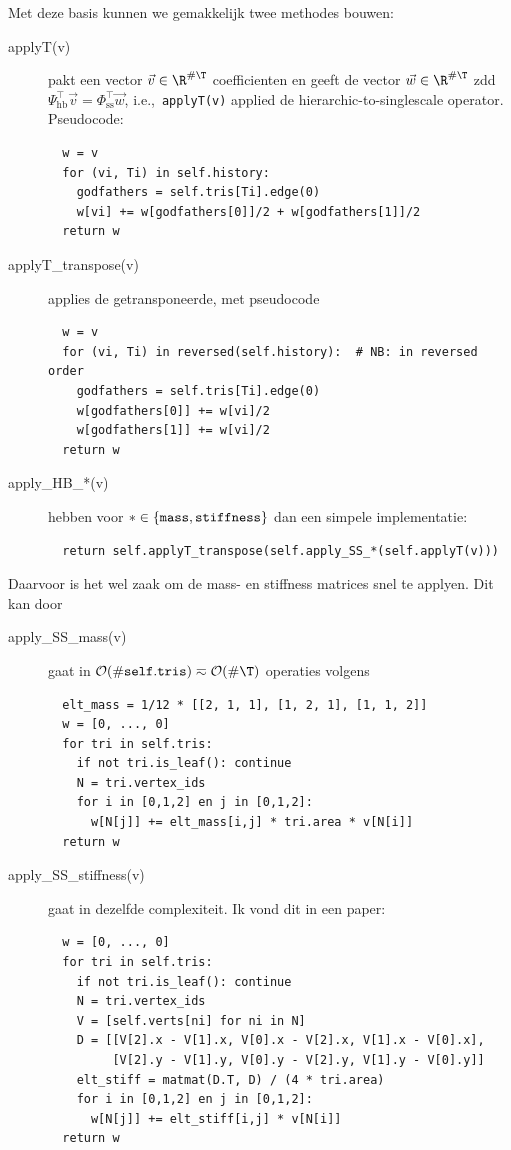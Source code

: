 \documentclass[11pt,a4paper]{amsart}
\theoremstyle{definition}
\begin{document}
Met deze basis kunnen we gemakkelijk twee methodes bouwen:
\begin{description}
  \item[applyT(v)] pakt een vector $\vec v \in \R^{\# \T}$ coefficienten en geeft de vector $\vec w \in \R^{\# \T}$ zdd $\Psi_{\text{hb}}^\top \vec v = \Phi_{\text{ss}}^\top \vec w$,
    i.e.,~\texttt{applyT(v)} applied de hierarchic-to-singlescale operator.
    Pseudocode:
\begin{verbatim}
  w = v
  for (vi, Ti) in self.history:
    godfathers = self.tris[Ti].edge(0)
    w[vi] += w[godfathers[0]]/2 + w[godfathers[1]]/2
  return w
\end{verbatim}
  \item[applyT\_transpose(v)] applies de getransponeerde, met pseudocode
\begin{verbatim}
  w = v
  for (vi, Ti) in reversed(self.history):  # NB: in reversed order
    godfathers = self.tris[Ti].edge(0)
    w[godfathers[0]] += w[vi]/2
    w[godfathers[1]] += w[vi]/2
  return w
\end{verbatim}
  \item[apply\_HB\_*(v)] hebben voor $* \in \set{\mathtt{mass}, \mathtt{stiffness}}$ dan een simpele
    implementatie:
\begin{verbatim}
  return self.applyT_transpose(self.apply_SS_*(self.applyT(v)))
\end{verbatim}
\end{description}
Daarvoor is het wel zaak om de mass- en stiffness matrices snel te applyen. Dit kan door
\begin{description}
  \item[apply\_SS\_mass(v)] gaat in $\mathcal O(\# \mathtt{self.tris}) \eqsim \mathcal O(\# \T)$ operaties volgens
\begin{verbatim}
  elt_mass = 1/12 * [[2, 1, 1], [1, 2, 1], [1, 1, 2]]
  w = [0, ..., 0]
  for tri in self.tris:
    if not tri.is_leaf(): continue
    N = tri.vertex_ids
    for i in [0,1,2] en j in [0,1,2]:
      w[N[j]] += elt_mass[i,j] * tri.area * v[N[i]]
  return w
\end{verbatim}
  \item[apply\_SS\_stiffness(v)] gaat in dezelfde complexiteit. Ik vond dit in een paper:
\begin{verbatim}
  w = [0, ..., 0]
  for tri in self.tris:
    if not tri.is_leaf(): continue
    N = tri.vertex_ids
    V = [self.verts[ni] for ni in N]
    D = [[V[2].x - V[1].x, V[0].x - V[2].x, V[1].x - V[0].x],
         [V[2].y - V[1].y, V[0].y - V[2].y, V[1].y - V[0].y]]
    elt_stiff = matmat(D.T, D) / (4 * tri.area)
    for i in [0,1,2] en j in [0,1,2]:
      w[N[j]] += elt_stiff[i,j] * v[N[i]]
  return w
\end{verbatim}
\end{description}
\end{document}
